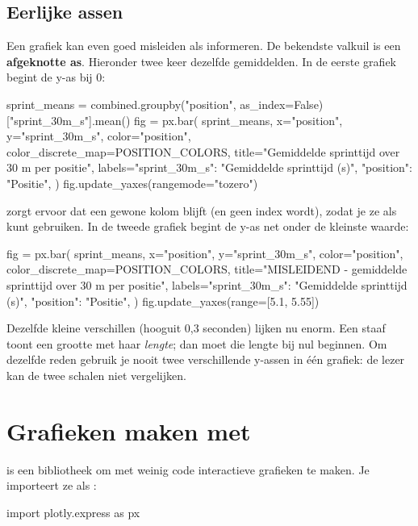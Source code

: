 \documentclass[11pt,a4paper]{article}
\begin{document}
\subsection{Eerlijke assen}

Een grafiek kan even goed misleiden als informeren. De bekendste valkuil
is een \textbf{afgeknotte as}. Hieronder twee keer dezelfde gemiddelden.
In de eerste grafiek begint de y-as bij 0:

\begin{python}[fig=eerlijk]
sprint_means = combined.groupby("position", as_index=False)["sprint_30m_s"].mean()
fig = px.bar(
    sprint_means, x="position", y="sprint_30m_s",
    color="position", color_discrete_map=POSITION_COLORS,
    title="Gemiddelde sprinttijd over 30 m per positie",
    labels={"sprint_30m_s": "Gemiddelde sprinttijd (s)", "position": "Positie"},
)
fig.update_yaxes(rangemode="tozero")
\end{python}

 zorgt ervoor dat  een gewone kolom
blijft (en geen index wordt), zodat je ze als  kunt gebruiken.
In de tweede grafiek begint de y-as net onder de kleinste waarde:

\begin{python}[fig=misleidend]
fig = px.bar(
    sprint_means, x="position", y="sprint_30m_s",
    color="position", color_discrete_map=POSITION_COLORS,
    title="MISLEIDEND - gemiddelde sprinttijd over 30 m per positie",
    labels={"sprint_30m_s": "Gemiddelde sprinttijd (s)", "position": "Positie"},
)
fig.update_yaxes(range=[5.1, 5.55])
\end{python}

Dezelfde kleine verschillen (hooguit 0,3 seconden) lijken nu enorm. Een
staaf toont een grootte met haar \emph{lengte}; dan moet die lengte bij
nul beginnen. Om dezelfde reden gebruik je nooit twee verschillende
y-assen in één grafiek: de lezer kan de twee schalen niet vergelijken.

\section{Grafieken maken met }

 is een bibliotheek om met weinig code interactieve
grafieken te maken. Je importeert ze als :

\begin{python}[noout]
import plotly.express as px
\end{python}
\end{document}
